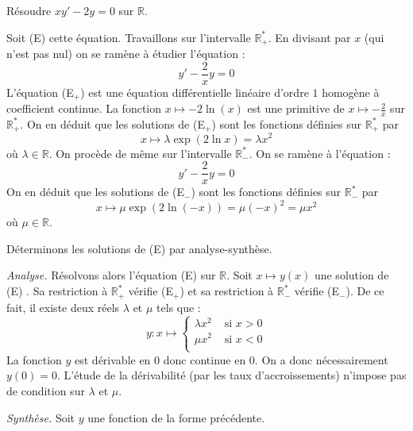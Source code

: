 \documentclass[a4paper,10pt]{report}
\begin{document}
\begin{Exa} Résoudre $xy' -2y = 0$ sur $\mathbb{R}$.
\end{Exa} 

\corr Soit (E) cette équation. Travaillons sur l'intervalle $\mathbb R_+^*$. En divisant par $x$ (qui n'est pas nul) on se ramène à étudier l'équation :
\begin{equation}
\tag{E$_+$}
y'  -\dfrac{2}{x}y = 0
\end{equation}
L'équation (E$_+$) est une équation différentielle  linéaire d'ordre $1$ homogène à coefficient continue. La fonction $x \mapsto -2\ln( x)$ est une primitive de $x \mapsto - \frac{2}{x}$ sur $\mathbb R_+^*$. On en déduit que les solutions de (E$_+$) sont les fonctions définies sur $\mathbb R_+^*$ par 
$$x \mapsto \lambda\exp(2\ln x) = \lambda x^2$$
où $\lambda \in \mathbb R$. On procède de même sur l'intervalle $\mathbb R_-^*$. On se ramène à l'équation :
\begin{equation}
\tag{E$_-$}
y'  -\dfrac{2}{x}y  = 0
\end{equation}
On en déduit que les solutions de (E$_-$) sont les fonctions définies sur $\mathbb R_-^*$ par 
$$x \mapsto \mu\exp(2\ln (-x)) = \mu(-x)^2 = \mu x^2$$
où $\mu \in \mathbb R$.

\noindent Déterminons les solutions de (E) par analyse-synthèse.

\medskip

\noindent \textit{Analyse.} Résolvons alors l'équation (E) sur $\mathbb R$. Soit $x \mapsto y(x)$ une solution de (E) . Sa restriction à $\mathbb R_+^*$ vérifie (E$_+$) et sa restriction à $\mathbb R_-^*$ vérifie (E$_-$). De ce fait, il existe deux réels $\lambda$ et $\mu$ tels que :
$$y : x \mapsto \left\{\begin{array}{ll} \lambda x^2 & \text{ si } x > 0 \\ \mu x^2 & \text{ si } x < 0\\\end{array} \right.$$
La fonction $y$ est dérivable en $0$ donc continue en $0$. On a donc nécessairement $y(0)=0$. L'étude de la dérivabilité (par les taux d'accroissements) n'impose pas de condition sur $\lambda$ et $\mu$.

\medskip

\noindent \textit{Synthèse.} Soit $y$ une fonction de la forme précédente.
\end{document}

